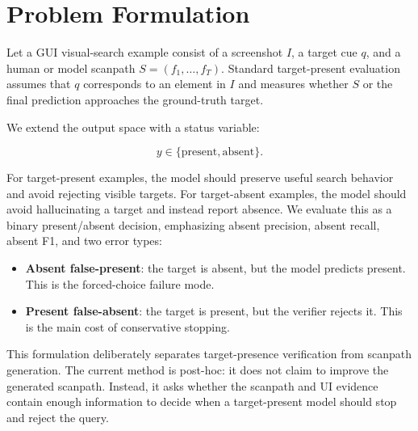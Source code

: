 \section{Problem Formulation}

Let a GUI visual-search example consist of a screenshot $I$, a target cue $q$, and a human or model scanpath $S = (f_1,\ldots,f_T)$. Standard target-present evaluation assumes that $q$ corresponds to an element in $I$ and measures whether $S$ or the final prediction approaches the ground-truth target.

We extend the output space with a status variable:

\[
  y \in \{\text{present}, \text{absent}\}.
\]

For target-present examples, the model should preserve useful search behavior and avoid rejecting visible targets. For target-absent examples, the model should avoid hallucinating a target and instead report absence. We evaluate this as a binary present/absent decision, emphasizing absent precision, absent recall, absent F1, and two error types:

\begin{itemize}
  \item \textbf{Absent false-present}: the target is absent, but the model predicts present. This is the forced-choice failure mode.
  \item \textbf{Present false-absent}: the target is present, but the verifier rejects it. This is the main cost of conservative stopping.
\end{itemize}

This formulation deliberately separates target-presence verification from scanpath generation. The current method is post-hoc: it does not claim to improve the generated scanpath. Instead, it asks whether the scanpath and UI evidence contain enough information to decide when a target-present model should stop and reject the query.
